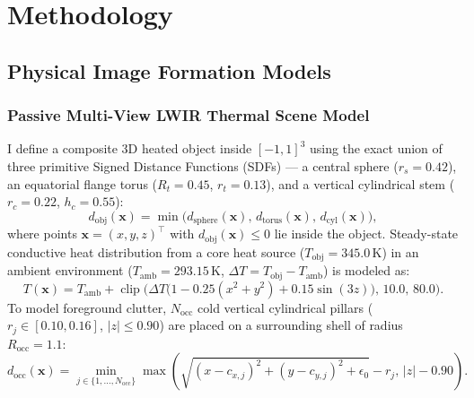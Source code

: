 \documentclass[12pt,letterpaper]{article}
\begin{document}
\section{Methodology}
\label{sec:methodology}

\subsection{Physical Image Formation Models}

\subsubsection{Passive Multi-View LWIR Thermal Scene Model}
I define a composite 3D heated object inside $[-1, 1]^3$ using the exact union of three primitive Signed Distance Functions (SDFs) --- a central sphere ($r_s = 0.42$), an equatorial flange torus ($R_t = 0.45$, $r_t = 0.13$), and a vertical cylindrical stem ($r_c = 0.22$, $h_c = 0.55$):
\begin{equation}
  d_{\text{obj}}(\mathbf{x}) = \min\!\Big(d_{\text{sphere}}(\mathbf{x}),\, d_{\text{torus}}(\mathbf{x}),\, d_{\text{cyl}}(\mathbf{x})\Big),
  \label{eq:sdf_union}
\end{equation}
where points $\mathbf{x} = (x, y, z)^\top$ with $d_{\text{obj}}(\mathbf{x}) \le 0$ lie inside the object. Steady-state conductive heat distribution from a core heat source ($T_{\text{obj}} = 345.0\,\text{K}$) in an ambient environment ($T_{\text{amb}} = 293.15\,\text{K}$, $\Delta T = T_{\text{obj}} - T_{\text{amb}}$) is modeled as:
\begin{equation}
  T(\mathbf{x}) = T_{\text{amb}} + \operatorname{clip}\!\Big(\Delta T \big(1 - 0.25(x^2 + y^2) + 0.15\sin(3z)\big),\, 10.0,\, 80.0\Big).
  \label{eq:temp_field}
\end{equation}
To model foreground clutter, $N_{\text{occ}}$ cold vertical cylindrical pillars ($r_j \in [0.10, 0.16]$, $|z| \le 0.90$) are placed on a surrounding shell of radius $R_{\text{occ}} = 1.1$:
\begin{equation}
  d_{\text{occ}}(\mathbf{x}) = \min_{j \in \{1, \dots, N_{\text{occ}}\}} \max\!\left(\sqrt{(x - c_{x,j})^2 + (y - c_{y,j})^2 + \epsilon_0} - r_j,\, |z| - 0.90\right).
  \label{eq:sdf_occ}
\end{equation}
\end{document}
